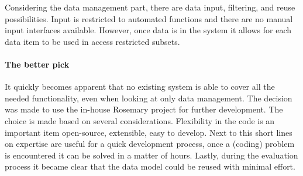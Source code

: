 Considering the data management part, there are data input, filtering, and reuse possibilities.
Input is restricted to automated functions and there are no manual input interfaces available.
However, once data is in the system it allows for each data item to be used in access restricted subsets.

\paragraph{The better pick}
It quickly becomes apparent that no existing system is able to cover all the needed functionality, even when looking at only data management.
The decision was made to use the in-house Rosemary project for further development.
The choice is made based on several considerations.
Flexibility in the code is an important item \ie{} open-source, extensible, easy to develop.
Next to this short lines on expertise are useful for a quick development process, once a (coding) problem is encountered it can be solved in a matter of hours.
Lastly, during the evaluation process it became clear that the data model could be reused with minimal effort.
